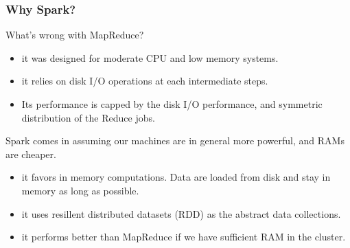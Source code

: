 \documentclass{beamer}
\begin{document}
\begin{frame}
\frametitle{Why Spark?}
What's wrong with MapReduce?
\begin{itemize}
 \item  it was designed for moderate CPU and low memory systems. 
 \item  it relies on disk I/O operations at each intermediate steps. 
 \item Its performance is capped by the disk I/O performance, and symmetric distribution of the
Reduce jobs.
\end{itemize}
Spark comes in assuming our machines are in general more powerful, and
RAMs are cheaper. 
\begin{itemize}
\item it favors in memory computations. Data are loaded from disk and
  stay in memory as long as possible.
\item it uses resillent distributed datasets (RDD) as the abstract data collections.
\item it performs better than MapReduce if we have sufficient RAM in
  the cluster.
\end{itemize}
\end{frame}
\end{document}
